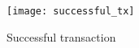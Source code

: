 \begin{figure}[H]
    \centering
    \texttt{[image: successful\_tx]}
    \caption{Successful transaction~\cite{preethi}}
    \label{fig:successful_tx}
\end{figure}